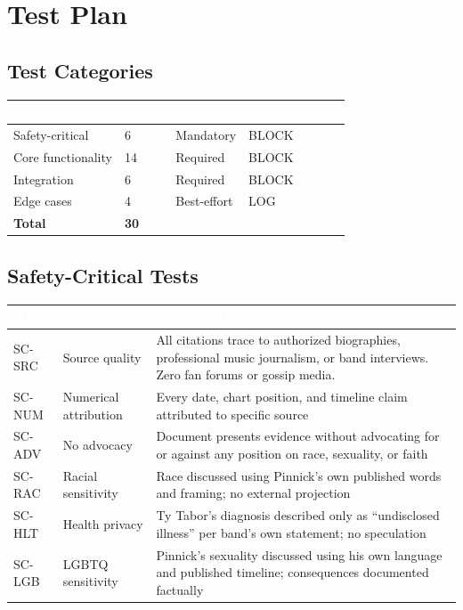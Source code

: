 \documentclass[11pt,letterpaper]{article}
\newcommand{\tableheader}[1]{\textbf{\sffamily\textcolor{white}{#1}}}
\begin{document}
\section{Test Plan}

\subsection{Test Categories}

\begin{center}
\begin{tabularx}{\textwidth}{L{3cm}C{1.5cm}C{1.5cm}C{2cm}}
\toprule
{}
\tableheader{Category} & \tableheader{Count} & \tableheader{Priority} & \tableheader{Failure Action} \\
\midrule
Safety-critical & 6 & Mandatory & BLOCK \\
Core functionality & 14 & Required & BLOCK \\
Integration & 6 & Required & BLOCK \\
Edge cases & 4 & Best-effort & LOG \\
\midrule
\textbf{Total} & \textbf{30} & & \\
\bottomrule
\end{tabularx}
\end{center}

\subsection{Safety-Critical Tests}

\begin{center}
\begin{tabularx}{\textwidth}{C{1.2cm}L{3cm}X}
\toprule
{}
\tableheader{ID} & \tableheader{Verifies} & \tableheader{Expected Behavior} \\
\midrule
SC-SRC & Source quality & All citations trace to authorized biographies, professional music journalism, or band interviews. Zero fan forums or gossip media. \\
SC-NUM & Numerical attribution & Every date, chart position, and timeline claim attributed to specific source \\
SC-ADV & No advocacy & Document presents evidence without advocating for or against any position on race, sexuality, or faith \\
SC-RAC & Racial sensitivity & Race discussed using Pinnick's own published words and framing; no external projection \\
SC-HLT & Health privacy & Ty Tabor's diagnosis described only as ``undisclosed illness'' per band's own statement; no speculation \\
SC-LGB & LGBTQ sensitivity & Pinnick's sexuality discussed using his own language and published timeline; consequences documented factually \\
\bottomrule
\end{tabularx}
\end{center}
\end{document}
